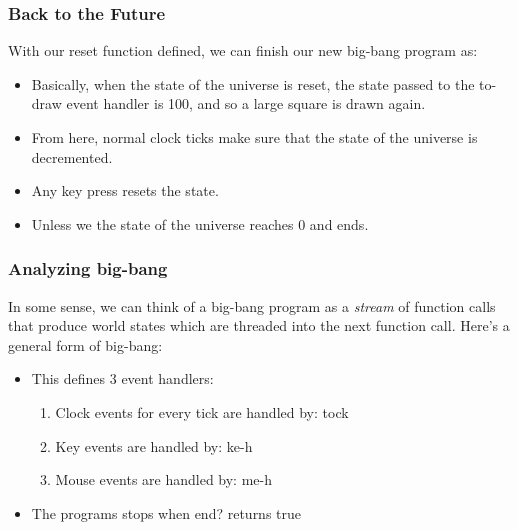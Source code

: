 \documentclass{beamer}
\begin{document}

\begin{frame}
  \frametitle{Back to the Future}
  With our reset function defined, we can finish our new big-bang
  program as:
  \pause
  \squareReset
  \begin{itemize}
  \item<3-> Basically, when the state of the universe is reset, the state
    passed to the to-draw event handler is 100, and so a large square is
    drawn again.
  \item<4-> From here, normal clock ticks make sure that the state of the universe
    is decremented.
  \item<5-> Any key press resets the state.
  \item<6-> Unless we the state of the universe reaches 0 and ends.
  \end{itemize}
\end{frame}


\begin{frame}
  \frametitle{Analyzing big-bang}
  In some sense, we can think of a big-bang program as a \emph{stream}
  of function calls that produce world states which are threaded into the next
  function call. Here's a general form of big-bang:
  \pause
  \generalForm
  \begin{itemize}
    \item<3-> This defines 3 event handlers:
      \begin{enumerate}
      \item<4-> Clock events for every tick are handled by: tock
      \item<5-> Key events are handled by: ke-h
      \item<6-> Mouse events are handled by: me-h
      \end{enumerate}
    \item<7-> The programs stops when end? returns true
  \end{itemize}
\end{frame}
\end{document}
